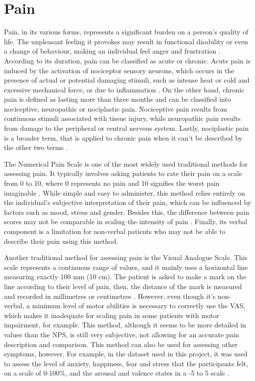 \section{Pain}

Pain, in its various forms, represents a significant burden on a person's quality of life. The unpleasant feeling it provokes may result in functional disability or even a change of behaviour, making an individual feel anger and frustration \cite{Dirk2021}. According to its duration, pain can be classified as acute or chronic. Acute pain is induced by the activation of nociceptor sensory neurons, which occurs in the presence of actual or potential damaging stimuli, such as intense heat or cold and excessive mechanical force, or due to inflammation \cite{Jayakar2021}. On the other hand, chronic pain is defined as lasting more than three months \cite{Raman2022} and can be classified into nociceptive, neuropathic or nociplastic pain. Nociceptive pain results from continuous stimuli associated with tissue injury, while neuropathic pain results from damage to the peripheral or central nervous system. Lastly, nociplastic pain is a broader term, that is applied to chronic pain when it can't be described by the other two terms \cite{Fitzcharles2021}.

The Numerical Pain Scale is one of the most widely used traditional methods for assessing pain. It typically involves asking patients to rate their pain on a scale from 0 to 10, where 0 represents no pain and 10 signifies the worst pain imaginable \cite{Nugent2021}. While simple and easy to administer, this method relies entirely on the individual’s subjective interpretation of their pain, which can be influenced by factors such as mood, stress and gender. Besides this, the difference between pain scores may not be comparable in scaling the intensity of pain \cite{Adeboye2021}. Finally, its verbal component is a limitation for non-verbal patients who may not be able to describe their pain using this method.

Another traditional method for assessing pain is the Visual Analogue Scale. This scale represents a continuous range of values, and it mainly uses a horizontal line measuring exactly 100 mm (10 cm). The patient is asked to make a mark on the line according to their level of pain, then, the distance of the mark is measured and recorded in millimetres or centimetres \cite{Bielewicz2022}. However, even though it’s non-verbal, a minimum level of motor abilities is necessary to correctly use the VAS, which makes it inadequate for scaling pain in some patients with motor impairment, for example. This method, although it seems to be more detailed in values than the NPS, is still very subjective, not allowing for an accurate pain description and comparison. This method can also be used for assessing other symptoms, however. For example, in the dataset used in this project, it was used to assess the level of anxiety, happiness, fear and stress that the participants felt, on a scale of 0-100\%, and the arousal and valence states in a -5 to 5 scale \cite{Alves2024}.



